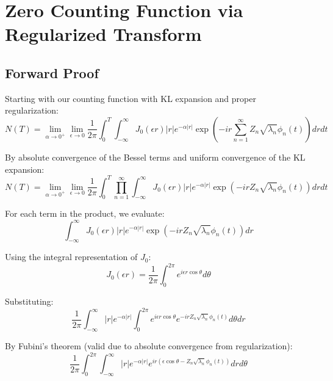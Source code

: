 \documentclass{article}
\begin{document}
\section{Zero Counting Function via Regularized Transform}

\subsection{Forward Proof}
Starting with our counting function with KL expansion and proper regularization:
\begin{equation}
    N(T) = \lim_{\alpha \to 0^+} \lim_{\epsilon \to 0} \frac{1}{2\pi} \int_0^T \int_{-\infty}^{\infty} J_0(\epsilon r)|r|e^{-\alpha|r|} \exp\left(-ir\sum_{n=1}^{\infty} Z_n \sqrt{\lambda_n} \phi_n(t)\right) dr dt
\end{equation}

By absolute convergence of the Bessel terms and uniform convergence of the KL expansion:
\begin{equation}
    N(T) = \lim_{\alpha \to 0^+} \lim_{\epsilon \to 0} \frac{1}{2\pi} \int_0^T \prod_{n=1}^{\infty} \int_{-\infty}^{\infty} J_0(\epsilon r)|r|e^{-\alpha|r|} \exp\left(-irZ_n \sqrt{\lambda_n} \phi_n(t)\right) dr dt
\end{equation}

For each term in the product, we evaluate:
\begin{equation}
    \int_{-\infty}^{\infty} J_0(\epsilon r)|r|e^{-\alpha|r|} \exp\left(-irZ_n \sqrt{\lambda_n} \phi_n(t)\right) dr
\end{equation}

Using the integral representation of $J_0$:
\begin{equation}
    J_0(\epsilon r) = \frac{1}{2\pi} \int_0^{2\pi} e^{i\epsilon r\cos\theta} d\theta
\end{equation}

Substituting:
\begin{equation}
    \frac{1}{2\pi} \int_{-\infty}^{\infty} |r|e^{-\alpha|r|} \int_0^{2\pi} e^{i\epsilon r\cos\theta} e^{-irZ_n \sqrt{\lambda_n} \phi_n(t)} d\theta dr
\end{equation}

By Fubini's theorem (valid due to absolute convergence from regularization):
\begin{equation}
    \frac{1}{2\pi} \int_0^{2\pi} \int_{-\infty}^{\infty} |r|e^{-\alpha|r|} e^{ir(\epsilon\cos\theta - Z_n \sqrt{\lambda_n} \phi_n(t))} dr d\theta
\end{equation}
\end{document}
